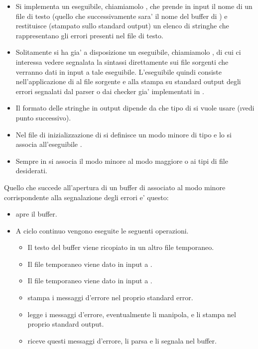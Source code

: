 \begin{itemize}
\item[\bbox] Si implementa un eseguibile, chiamiamolo , che prende in input il nome di un file di testo (quello che successivamente sara' il nome del buffer di ) e restituisce (stampato sullo standard output) un elenco di stringhe che rappresentano gli errori presenti nel file di testo.
\item[] Solitamente si ha gia' a disposizione un eseguibile, chiamiamolo , di cui ci interessa vedere segnalata la sintassi direttamente sui file sorgenti che verranno dati in input a tale eseguibile. L'eseguibile  quindi consiste nell'applicazione di  al file sorgente e alla stampa su standard output degli errori segnalati dal parser o dai checker gia' implementati in .
\item[] Il formato delle stringhe in output dipende da che tipo di  si vuole usare (\i{vedi punto successivo}).
\item[\bbox] Nel file di inizializzazione  di  si definisce un modo minore di tipo  e lo si associa all'eseguibile .
\item[] Sempre in  si associa il modo minore  al modo maggiore o ai tipi di file desiderati.
\end{itemize}

Quello che succede all'apertura di un buffer di  associato al modo minore corrispondente alla segnalazione degli errori e' questo:

\begin{itemize}
\item[\bbox]  apre il buffer.
\item[\bbox] A ciclo continuo vengono eseguite le seguenti operazioni.
\begin{itemize}
\item[\bball] Il testo del buffer viene ricopiato in un altro file temporaneo.
\item[\bball] Il file temporaneo viene dato in input a .
\item[\bball] Il file temporaneo viene dato in input a .
\item[\bball]  stampa i messaggi d'errore nel proprio standard error.
\item[\bball]  legge i messaggi d'errore, eventualmente li manipola, e li stampa nel proprio standard output.
\item[\bball]  riceve questi messaggi d'errore, li parsa e li segnala nel buffer.
\end{itemize}
\end{itemize}
